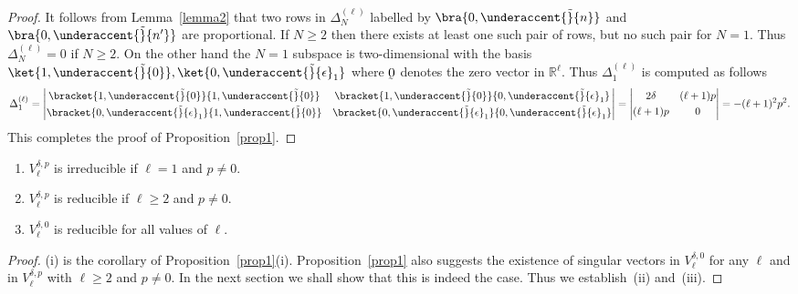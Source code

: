 \documentclass[pdftex]{sigma}
\numberwithin{equation}{section}
\begin{document}
\begin{proof}
It follows from Lemma~\ref{lemma2} that two rows in $ \Delta^{(\ell)}_N $ labelled by $ \bra{0,\underaccent{\tilde}{n}}
$ and $ \bra{0,\underaccent{\tilde}{n'}} $ are proportional.
If $ N \geq 2 $ then there exists at least one such pair of rows, but no such pair for $N = 1$.
Thus $ \Delta^{(\ell)}_N = 0 $ if $ N \geq 2$.
On the other hand the $ N = 1 $ subspace is two-dimensional with the basis $ \ket{1, \underaccent{\tilde}{0}}, \ket{0,
\underaccent{\tilde}{\epsilon}_1} $ where $\underaccent{\tilde}{0}$ denotes the zero vector in ${\mathbb R}^{\ell}$.
Thus $ \Delta^{(\ell)}_1 $ is computed as follows
\begin{gather*}
\Delta^{(\ell)}_1 = \left|
\begin{matrix} \bracket{1, \underaccent{\tilde}{0}}{1, \underaccent{\tilde}{0}} & \bracket{1, \underaccent{\tilde}{0}}{0,
\underaccent{\tilde}{\epsilon}_1}
\vspace{1mm}\\  \bracket{0, \underaccent{\tilde}{\epsilon}_1}{1, \underaccent{\tilde}{0}} & \bracket{0,
\underaccent{\tilde}{\epsilon}_1}{0, \underaccent{\tilde}{\epsilon}_1}
\end{matrix}
\right| = \left|
\begin{matrix} 2 \delta & (\ell+1)p
\vspace{1mm}\\  (\ell+1)p & 0
\end{matrix}
\right| = - (\ell+1)^2   p^2   .
\end{gather*}
This completes the proof of Proposition~\ref{prop1}.
\end{proof}



\begin{proposition}\qquad
\label{prop2}
\begin{enumerate}\itemsep=0pt
\item[$i)$] $ V^{\delta,p}_{\ell} $ is irreducible if $ \ell = 1 $ and $ p \neq 0$.
\item[$ii)$] $ V^{\delta,p}_{\ell} $ is reducible if $ \ell \geq 2 $ and $ p \neq 0$.
\item[$iii)$] $ V^{\delta,0}_{\ell} $ is reducible for all values of $ \ell$.
\end{enumerate}
\end{proposition}



\begin{proof}
(i) is the corollary of Proposition~\ref{prop1}(i).
Proposition~\ref{prop1} also suggests the existence of singular vectors in $V^{\delta,0}_{\ell} $ for any $\ell$ and
in $V^{\delta,p}_{\ell}$ with $\ell \geq 2$ and $p \neq 0$.
In the next section we shall show that this is indeed the case.
Thus we establish~(ii) and~(iii).
\end{proof}
\end{document}
